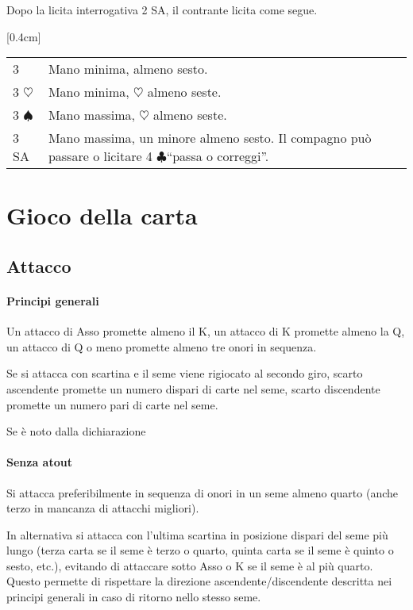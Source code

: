 \documentclass[a4paper,10pt]{article}
\renewcommand{\c}{$\clubsuit$\xspace}
\newcommand{\h}{$\heartsuit$\xspace}
\newcommand{\s}{$\spadesuit$\xspace}
\newcommand{\sa}{SA\xspace}
\newcommand{\m}{\raisebox{-1.2pt}{$^\clubsuit \mkern-4.5mu$} \raisebox{1.2pt}{$\mkern-4.5mu _\diamondsuit$}\xspace}%
\newcommand{\smallspace}{\vskip0.3cm}
\renewcommand{\tabcolsep}{0.3cm}
\newenvironment{twocol}
  {\smallspace\noindent\begin{tabular}{l p{0.78\textwidth}}}
  {\end{tabular}\smallspace}
\newcommand{\biddingtable}[2][0.4cm]{
  \needspace{1cm}
  \marginnote{
    \scriptsize{
    \def\arraystretch{1.5}
    \renewcommand{\tabcolsep}{0.1cm}
    \begin{tabular}{|>{\centering\arraybackslash}p{0.6cm}>{\centering\arraybackslash}p{0.6cm}>{\centering\arraybackslash}p{0.6cm}>{\centering\arraybackslash}p{0.6cm}|}
      \hline
      #2
    \end{tabular}
    }
  }[#1]
}
\begin{document}
Dopo la licita interrogativa 2 \sa, il contrante licita come segue.
\biddingtable{1 \s & P & 2 \s & P \\ P & X & P & 2 \sa \\ P & * &&}
\begin{twocol}
	3 \m & Mano minima, \m almeno sesto.\\
	3 \h & Mano minima, \h almeno seste.\\
	3 \s & Mano massima, \h almeno seste.\\
	3 \sa & Mano massima, un minore almeno sesto. Il compagno può passare o licitare 4 \c ``passa o correggi''.\\
\end{twocol}

\pagebreak

\section{Gioco della carta}

\subsection{Attacco}

\paragraph{Principi generali} Un attacco di Asso promette almeno il K, un attacco di K promette almeno la Q, un attacco di Q o meno promette almeno tre onori in sequenza.

Se si attacca con scartina e il seme viene rigiocato al secondo giro, scarto ascendente promette un numero dispari di carte nel seme, scarto discendente promette un numero pari di carte nel seme.

Se è noto dalla dichiarazione

\paragraph{Senza atout} Si attacca preferibilmente in sequenza di onori in un seme almeno quarto (anche terzo in mancanza di attacchi migliori).

In alternativa si attacca con l'ultima scartina in posizione dispari del seme più lungo (terza carta se il seme è terzo o quarto, quinta carta se il seme è quinto o sesto, etc.), evitando di attaccare sotto Asso o K se il seme è al più quarto. Questo permette di rispettare la direzione ascendente/discendente descritta nei principi generali in caso di ritorno nello stesso seme.
\end{document}
